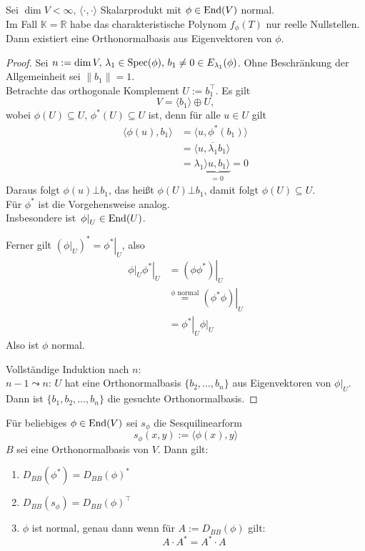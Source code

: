 \documentclass[parskip,a4paper,twoside,DIV15,BCOR12mm]{scrbook}
\begin{document}
\begin{theo}[Spektralsatz]
\label{Satz 18.1}
Sei \(\dim V<\infty,\,\langle\cdot,\cdot\rangle\) Skalarprodukt mit 
\(\phi\in\operatorname{End}(V)\) normal.\\
Im Fall \(\mathbb{K}=\mathbb{R}\) habe das charakteristische Polynom 
\(f_{\phi}(T)\) nur reelle Nullstellen. Dann existiert eine Orthonormalbasis
aus Eigenvektoren von \(\phi\).
\end{theo}
\begin{proof}
Sei \(n:=\dim V,\,\lambda_{1}\in\operatorname{Spec}(\phi),\,b_{1}\neq0\in E_{\lambda_{1}}(\phi)\). Ohne Beschränkung der Allgemeinheit sei \(\lVert b_{1}\rVert=1\).\\
Betrachte das orthogonale Komplement \(U:=b_{1}^{\top}\). Es gilt
\[
V=\langle b_{1}\rangle\oplus U,
\]
wobei \(\phi(U)\subseteq U,\,\phi^{*}(U)\subseteq U\) ist, denn für alle 
\(u\in U\) gilt
\begin{align*}
\langle\phi(u),b_{1}\rangle&=\langle u,\phi^{*}(b_{1})\rangle\\
&=\langle u,\overline{\lambda_{1}}b_{1}\rangle\\
&=\lambda_{1}\underbrace{\rangle u,b_{1}\rangle}_{=0}=0
\end{align*}
Daraus folgt \(\phi(u)\bot b_{1}\), das heißt \(\phi(U)\bot b_{1}\), damit
folgt \(\phi(U)\subseteq U\).\\
Für \(\phi^{*}\) ist die Vorgehensweise analog.\\
Insbesondere ist \(\left.\phi\right|_{U}\in\operatorname{End}(U)\).

Ferner gilt \(\left(\left.\phi\right|_{U}\right)^{*}=\left.\phi^{*}\right|_{U}\), also
\begin{align*}
\left.\phi\right|_{U}\left.\phi^{*}\right|_{U}&=\left.\left(\phi\phi^{*}\right)\right|_{U}\\
&\overset{\phi\text{ normal}}{=}\left.\left(\phi^{*}\phi\right)\right|_{U}\\
&=\left.\phi^{*}\right|_{U}\left.\phi\right|_{U}
\end{align*}
Also ist \(\phi\) normal.

Vollständige Induktion nach \(n\):\\
\(n-1 \leadsto n\): \(U\) hat eine Orthonormalbasis \(\{b_{2},\ldots,b_{n}\}\)
aus Eigenvektoren von \(\left.\phi\right|_{U}\).\\
Dann ist \(\{b_{1},b_{2},\ldots,b_{n}\}\) die gesuchte Orthonormalbasis.
\end{proof}
\begin{lemma}
Für beliebiges \(\phi\in\operatorname{End}(V)\) sei \(s_{\phi}\) die Sesquilinearform
\[
s_{\phi}(x,y):=\langle\phi(x),y\rangle
\]
\(B\) sei eine Orthonormalbasis von \(V\). Dann gilt:
\begin{enumerate}
\item\(D_{BB}(\phi^{*})=D_{BB}(\phi)^{*}\)
\label{Lemma: 18.2; 1; Beh. 1}
\item\(D_{BB}(s_{\phi})=D_{BB}(\phi)^{\top}\)
\label{Lemma: 18.2; 1; Beh. 2}
\item\(\phi\) ist normal, genau dann wenn für \(A:=D_{BB}(\phi)\) gilt:
\label{Lemma: 18.2; 1; Beh. 3}
\[
A\cdot A^{*}=A^{*}\cdot A
\]
\end{enumerate}
\end{lemma}
\end{document}
